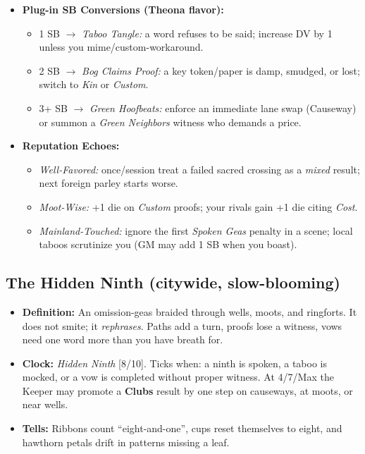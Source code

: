 \begin{itemize}
  \item \textbf{Plug-in SB Conversions (Theona flavor):}
  \begin{itemize}
    \item 1 SB \(\rightarrow\) \emph{Taboo Tangle:} a word refuses to be said; increase DV by 1 unless you mime/custom-workaround.
    \item 2 SB \(\rightarrow\) \emph{Bog Claims Proof:} a key token/paper is damp, smudged, or lost; switch to \emph{Kin} or \emph{Custom}.
    \item 3+ SB \(\rightarrow\) \emph{Green Hoofbeats:} enforce an immediate lane swap (Causeway) or summon a \emph{Green Neighbors} witness who demands a price.
  \end{itemize}

  \item \textbf{Reputation Echoes:}
  \begin{itemize}
    \item \emph{Well-Favored:} once/session treat a failed sacred crossing as a \emph{mixed} result; next foreign parley starts worse.
    \item \emph{Moot-Wise:} +1 die on \emph{Custom} proofs; your rivals gain +1 die citing \emph{Cost}.
    \item \emph{Mainland-Touched:} ignore the first \emph{Spoken Geas} penalty in a scene; local taboos scrutinize you (GM may add 1 SB when you boast).
  \end{itemize}
\end{itemize}

\subsection*{The Hidden Ninth (citywide, slow-blooming)}
\begin{itemize}
  \item \textbf{Definition:} An omission-geas braided through wells, moots, and ringforts. It does not smite; it \emph{rephrases}. Paths add a turn, proofs lose a witness, vows need one word more than you have breath for.
  \item \textbf{Clock:} \emph{Hidden Ninth} [8/10]. Ticks when: a ninth is spoken, a taboo is mocked, or a vow is completed without proper witness. At 4/7/Max the Keeper may promote a \textbf{Clubs} result by one step on causeways, at moots, or near wells.
  \item \textbf{Tells:} Ribbons count “eight-and-one”, cups reset themselves to eight, and hawthorn petals drift in patterns missing a leaf.
\end{itemize}

